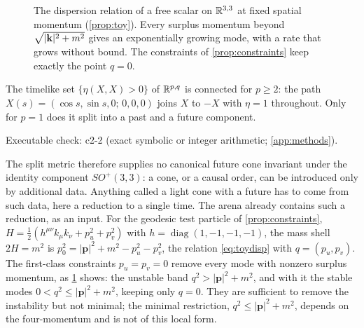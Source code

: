 \begin{figure}[t]
\centering
{}
\caption{The dispersion relation of a free scalar on $\mathbb{R}^{3,3}$ at fixed spatial momentum (\cref{prop:toy}). Every surplus momentum beyond $\sqrt{|\mathbf k|^2+m^2}$ gives
an exponentially growing mode, with a rate that grows without bound. The constraints of \cref{prop:constraints} keep exactly the point $q=0$.}
\label{fig:toy}
\end{figure}

\begin{proposition}
\label{prop:orient}
The timelike set $\{\eta(X,X)>0\}$ of $\mathbb{R}^{p,q}$ is connected for $p\ge2$: the path $X(s)=(\cos s,\sin s,0;\,0,0,0)$ joins $X$ to $-X$ with $\eta=1$ throughout. Only for $p=1$
does it split into a past and a future component.
\end{proposition}

\noindent Executable check: c2-2 (exact symbolic or integer arithmetic; \cref{app:methods}).

The split metric therefore supplies no canonical future cone invariant under the identity component $SO^+(3,3)$: a cone, or a causal order, can be
introduced only by additional data. Anything called a light cone with a future has to come from such data, here a reduction to a single time. The arena already contains such a reduction, as an input. For the geodesic test particle of \cref{prop:constraints}, $H=\tfrac12(h^{\mu\nu}k_\mu k_\nu+p_u^2+p_v^2)$
with $h=\operatorname{diag}(1,-1,-1,-1)$, the mass shell $2H=m^2$ is $p_0^2=|\mathbf p|^2+m^2-p_u^2-p_v^2$, the relation \eqref{eq:toydisp} with $q=(p_u,p_v)$. The
first-class constraints $p_u=p_v=0$ remove every mode with nonzero surplus momentum, as \cref{fig:toy} shows: the unstable band
$q^2>|\mathbf p|^2+m^2$, and with it the stable modes $0<q^2\le|\mathbf p|^2+m^2$, keeping only $q=0$. They are sufficient to remove the instability
but not minimal; the minimal restriction, $q^2\le|\mathbf p|^2+m^2$, depends on the four-momentum and is not of this local form.

